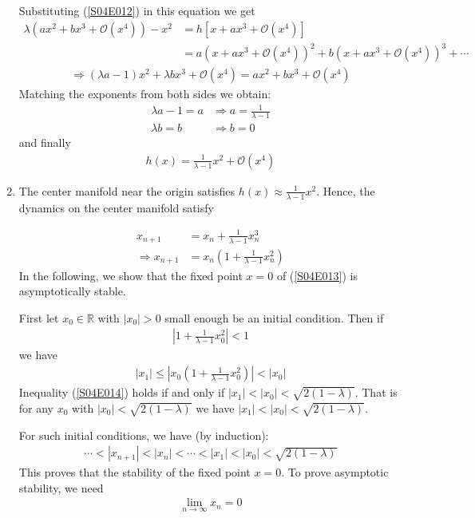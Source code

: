 \begin{solution}[4.1]
\begin{enumerate}
Substituting (\ref{S04E012}) in this equation we get
\begin{align}
	\lambda(ax^2 + bx^3 + \mathcal{O}(x^4)) - x^2 &= h[x + ax^3 + \mathcal{O}(x^4)] \\
	&= a(x + ax^3 + \mathcal{O}(x^4))^2 + b(x + ax^3 + \mathcal{O}(x^4))^3 + \cdots
\end{align}
\begin{align}
	\Longrightarrow (\lambda a - 1)x^2 + \lambda b x^3 + \mathcal{O}(x^4) = ax^2 + bx^3 + \mathcal{O}(x^4)
\end{align}
Matching the exponents from both sides we obtain:
\begin{align}
	\lambda a - 1 = a &\Longrightarrow a = \frac{1}{\lambda - 1} \\
	\lambda b = b &\Longrightarrow b = 0
\end{align}
and finally
\begin{align}
	\boxed{
		h(x) = \frac{1}{\lambda - 1}x^2 + \mathcal{O}(x^4)	
	}
\end{align}


\item The center manifold near the origin satisfies $h(x) \approx \frac{1}{\lambda - 1}x^2$.
Hence, the dynamics on the center manifold satisfy

\begin{align}
	x_{n+1} &= x_n + \frac{1}{\lambda - 1}x_n^3 \nonumber \\
	\Longrightarrow x_{n+1} &= x_n \left( 1 + \frac{1}{\lambda - 1}x_n^2 \right) \label{S04E013}
\end{align}
In the following, we show that the fixed point $x=0$ of (\ref{S04E013}) is asymptotically stable. 

First let $x_0 \in \mathbb{R}$ with $|x_0|>0$ small enough be an initial condition. Then if
\begin{align}\label{S04E014}
	\left\vert 1 + \frac{1}{\lambda - 1}x_0^2 \right\vert < 1
\end{align}
we have
\begin{align}
	|x_1| \leq \left\vert x_0 \left( 1 + \frac{1}{\lambda - 1}x_0^2 \right) \right\vert < |x_0|
\end{align}
Inequality (\ref{S04E014}) holds if and only if $|x_1| < |x_0| < \sqrt{2(1-\lambda)}$. That is for any $x_0$ with $|x_0|<\sqrt{2(1-\lambda)}$ we have $|x_1| < |x_0| < \sqrt{2(1-\lambda)}$.

For such initial conditions, we have (by induction):
\begin{align}\label{S04E015}
	\cdots < |x_{n+1}| < |x_n| < \cdots < |x_1| < |x_0| < \sqrt{2(1-\lambda)}
\end{align}
This proves that the stability of the fixed point $x=0$. To prove asymptotic stability, we need
\begin{align}
	\lim_{n \rightarrow \infty} x_n = 0
\end{align}


\end{enumerate}
\end{solution}
